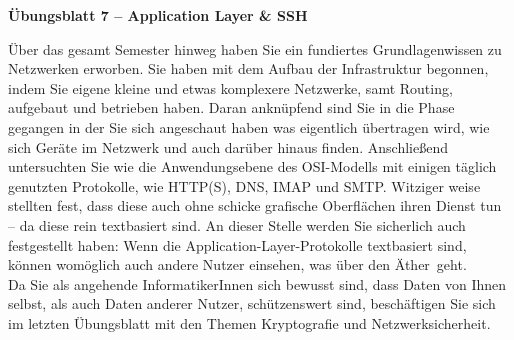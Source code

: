 \documentclass[paper=a4,fontsize=11pt]{scrartcl}%
\numberwithin{equation}{section}
\begin{document}
\begin{center}
\Large{\textbf{Übungsblatt 7 -- Application Layer \& SSH}}
\end{center}
Über das gesamt Semester hinweg haben Sie ein fundiertes Grundlagenwissen zu Netzwerken erworben. Sie haben mit dem Aufbau der Infrastruktur begonnen, indem Sie eigene kleine und etwas komplexere Netzwerke, samt Routing, aufgebaut und betrieben haben. Daran anknüpfend sind Sie in die Phase gegangen in der Sie sich angeschaut haben was eigentlich übertragen wird, wie sich Geräte im Netzwerk und auch darüber hinaus finden. Anschließend untersuchten Sie wie die Anwendungsebene des OSI-Modells mit einigen täglich genutzten Protokolle, wie HTTP(S), DNS, IMAP und SMTP. Witziger weise stellten fest, dass diese auch ohne schicke grafische Oberflächen ihren Dienst tun -- da diese rein textbasiert sind. An dieser Stelle werden Sie sicherlich auch festgestellt haben: Wenn die Application-Layer-Protokolle textbasiert sind, können womöglich auch andere Nutzer einsehen, was über den \glqq Äther\grqq\ geht.\\
Da Sie als angehende InformatikerInnen sich bewusst sind, dass Daten von Ihnen selbst, als auch Daten anderer Nutzer, schützenswert sind, beschäftigen Sie sich im letzten Übungsblatt mit den Themen Kryptografie und Netzwerksicherheit.
\end{document}
